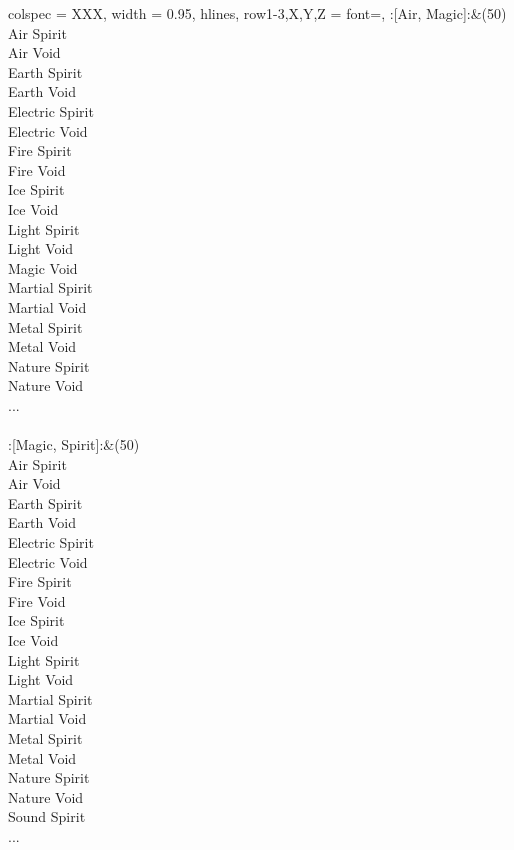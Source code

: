 \begin{longtblr}[
	caption = {2v2 Defending Weak},
	label = {2v2-Defending-Weak},
]{
	colspec = {XXX}, width = 0.95\linewidth,
	hlines,
	row{1-3,X,Y,Z} = {font=\bfseries},
}
	:[Air, Magic]:&{(50)\\
	Air Spirit \\
	Air Void \\
	Earth Spirit \\
	Earth Void \\
	Electric Spirit \\
	Electric Void \\
	Fire Spirit \\
	Fire Void \\
	Ice Spirit \\
	Ice Void \\
	Light Spirit \\
	Light Void \\
	Magic Void \\
	Martial Spirit \\
	Martial Void \\
	Metal Spirit \\
	Metal Void \\
	Nature Spirit \\
	Nature Void \\
	...\\
	}\\

	:[Magic, Spirit]:&{(50)\\
	Air Spirit \\
	Air Void \\
	Earth Spirit \\
	Earth Void \\
	Electric Spirit \\
	Electric Void \\
	Fire Spirit \\
	Fire Void \\
	Ice Spirit \\
	Ice Void \\
	Light Spirit \\
	Light Void \\
	Martial Spirit \\
	Martial Void \\
	Metal Spirit \\
	Metal Void \\
	Nature Spirit \\
	Nature Void \\
	Sound Spirit \\
	...\\
	}\\


\end{longtblr}
